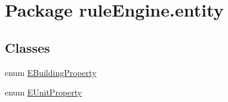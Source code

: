 \hypertarget{namespacerule_engine_1_1entity}{}\section{Package rule\+Engine.\+entity}
\label{namespacerule_engine_1_1entity}
\subsection*{Classes}
\begin{DoxyCompactItemize}
\item 
enum \mbox{\hyperlink{enumrule_engine_1_1entity_1_1_e_building_property}{E\+Building\+Property}}
\item 
enum \mbox{\hyperlink{enumrule_engine_1_1entity_1_1_e_unit_property}{E\+Unit\+Property}}
\end{DoxyCompactItemize}
